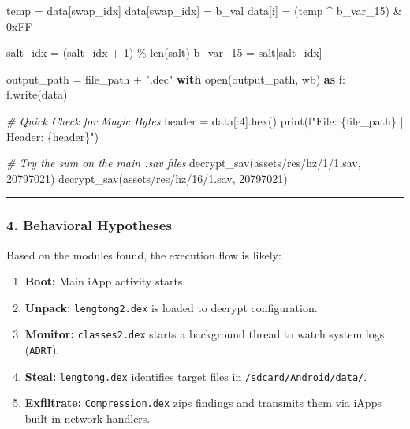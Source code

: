 \documentclass[
]{article}
\newenvironment{Shaded}{}{}
\newcommand{\BaseNTok}[1]{\textcolor[rgb]{0.25,0.63,0.44}{#1}}
\newcommand{\BuiltInTok}[1]{\textcolor[rgb]{0.00,0.50,0.00}{#1}}
\newcommand{\CommentTok}[1]{\textcolor[rgb]{0.38,0.63,0.69}{\textit{#1}}}
\newcommand{\ControlFlowTok}[1]{\textcolor[rgb]{0.00,0.44,0.13}{\textbf{#1}}}
\newcommand{\DecValTok}[1]{\textcolor[rgb]{0.25,0.63,0.44}{#1}}
\newcommand{\ImportTok}[1]{\textcolor[rgb]{0.00,0.50,0.00}{\textbf{#1}}}
\newcommand{\NormalTok}[1]{#1}
\newcommand{\OperatorTok}[1]{\textcolor[rgb]{0.40,0.40,0.40}{#1}}
\newcommand{\SpecialCharTok}[1]{\textcolor[rgb]{0.25,0.44,0.63}{#1}}
\newcommand{\SpecialStringTok}[1]{\textcolor[rgb]{0.73,0.40,0.53}{#1}}
\newcommand{\StringTok}[1]{\textcolor[rgb]{0.25,0.44,0.63}{#1}}
\begin{document}
\begin{Shaded}
\begin{Highlighting}[]
\NormalTok{        temp }\OperatorTok{=}\NormalTok{ data[swap\_idx]}
\NormalTok{        data[swap\_idx] }\OperatorTok{=}\NormalTok{ b\_val}
\NormalTok{        data[i] }\OperatorTok{=}\NormalTok{ (temp }\OperatorTok{\^{}}\NormalTok{ b\_var\_15) }\OperatorTok{\&} \BaseNTok{0xFF}
        
\NormalTok{        salt\_idx }\OperatorTok{=}\NormalTok{ (salt\_idx }\OperatorTok{+} \DecValTok{1}\NormalTok{) }\OperatorTok{\%} \BuiltInTok{len}\NormalTok{(salt)}
\NormalTok{        b\_var\_15 }\OperatorTok{=}\NormalTok{ salt[salt\_idx]}

\NormalTok{    output\_path }\OperatorTok{=}\NormalTok{ file\_path }\OperatorTok{+} \StringTok{".dec"}
    \ControlFlowTok{with} \BuiltInTok{open}\NormalTok{(output\_path, }\StringTok{\textquotesingle{}wb\textquotesingle{}}\NormalTok{) }\ImportTok{as}\NormalTok{ f:}
\NormalTok{        f.write(data)}
    
    \CommentTok{\# Quick Check for Magic Bytes}
\NormalTok{    header }\OperatorTok{=}\NormalTok{ data[:}\DecValTok{4}\NormalTok{].}\BuiltInTok{hex}\NormalTok{()}
    \BuiltInTok{print}\NormalTok{(}\SpecialStringTok{f"File: }\SpecialCharTok{\{}\NormalTok{file\_path}\SpecialCharTok{\}}\SpecialStringTok{ | Header: }\SpecialCharTok{\{}\NormalTok{header}\SpecialCharTok{\}}\SpecialStringTok{"}\NormalTok{)}

\CommentTok{\# Try the sum on the main .sav files}
\NormalTok{decrypt\_sav(}\StringTok{\textquotesingle{}assets/res/hz/1/1.sav\textquotesingle{}}\NormalTok{, }\DecValTok{20797021}\NormalTok{)}
\NormalTok{decrypt\_sav(}\StringTok{\textquotesingle{}assets/res/hz/16/1.sav\textquotesingle{}}\NormalTok{, }\DecValTok{20797021}\NormalTok{)}
\end{Highlighting}
\end{Shaded}

\begin{center}\rule{0.5\linewidth}{0.5pt}\end{center}

\subsubsection{4. Behavioral Hypotheses}\label{4-behavioral-hypotheses}

Based on the modules found, the execution flow is likely:

\begin{enumerate}
\def\labelenumi{\arabic{enumi}.}
\item
  \textbf{Boot:} Main iApp activity starts.
\item
  \textbf{Unpack:} \texttt{lengtong2.dex} is loaded to decrypt
  configuration.
\item
  \textbf{Monitor:} \texttt{classes2.dex} starts a background thread to
  watch system logs (\texttt{ADRT}).
\item
  \textbf{Steal:} \texttt{lengtong.dex} identifies target files in
  \texttt{/sdcard/Android/data/}.
\item
  \textbf{Exfiltrate:} \texttt{Compression.dex} zips findings and
  transmits them via iApp\textquotesingle s built-in network handlers.
\end{enumerate}
\end{document}

